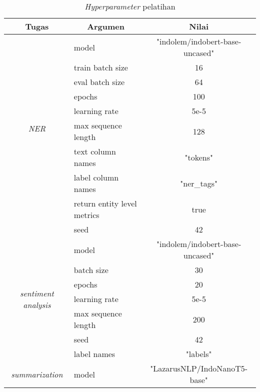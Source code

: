 \begin{table}[h]
    \centering
    \caption{\textit{Hyperparameter} pelatihan}
    \label{table:hyperparameter-train}
    \begin{tabular}{|c|l|c|}
        \hline \rowcolor{black!10}
        \textbf{Tugas} & \multicolumn{1}{|c|}{\textbf{Argumen}} & \textbf{Nilai} \\ \hline
        \multirow{9}{*}{\textit{NER}} & model & "indolem/indobert-base-uncased" \\ \cline{2-3}
                                      & train batch size & 16 \\ \cline{2-3}
                                      & eval batch size & 64 \\ \cline{2-3}
                                      & epochs & 100 \\ \cline{2-3}
                                      & learning rate & 5e-5 \\ \cline{2-3}
                                      & max sequence length & 128 \\ \cline{2-3}
                                      & text column names & "tokens" \\ \cline{2-3}
                                      & label column names & "ner\_tags" \\ \cline{2-3}
                                      & return entity level metrics & true \\ \cline{2-3}
                                      & seed & 42 \\ \hline
        \multirow{7}{*}{\textit{sentiment analysis}} & model & "indolem/indobert-base-uncased" \\ \cline{2-3}
                                                     & batch size & 30 \\ \cline{2-3}
                                                     & epochs & 20 \\ \cline{2-3}
                                                     & learning rate & 5e-5 \\ \cline{2-3}
                                                     & max sequence length & 200 \\ \cline{2-3}
                                                     & seed & 42 \\ \cline{2-3}
                                                     & label names & "labels" \\ \hline
        \multirow{14}{*}{\textit{summarization}} & model & "LazarusNLP/IndoNanoT5-base" \\ \cline{2-3}

\end{tabular}
\end{table}
